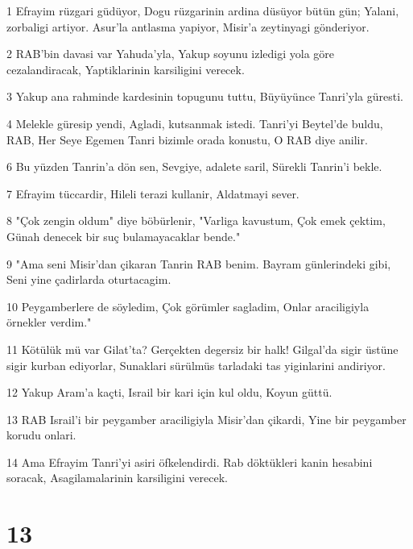 \par 1 Efrayim rüzgari güdüyor, Dogu rüzgarinin ardina düsüyor bütün gün; Yalani, zorbaligi artiyor. Asur'la antlasma yapiyor, Misir'a zeytinyagi gönderiyor.
\par 2 RAB'bin davasi var Yahuda'yla, Yakup soyunu izledigi yola göre cezalandiracak, Yaptiklarinin karsiligini verecek.
\par 3 Yakup ana rahminde kardesinin topugunu tuttu, Büyüyünce Tanri'yla güresti.
\par 4 Melekle güresip yendi, Agladi, kutsanmak istedi. Tanri'yi Beytel'de buldu, RAB, Her Seye Egemen Tanri bizimle orada konustu, O RAB diye anilir.
\par 6 Bu yüzden Tanrin'a dön sen, Sevgiye, adalete saril, Sürekli Tanrin'i bekle.
\par 7 Efrayim tüccardir, Hileli terazi kullanir, Aldatmayi sever.
\par 8 "Çok zengin oldum" diye böbürlenir, "Varliga kavustum, Çok emek çektim, Günah denecek bir suç bulamayacaklar bende."
\par 9 "Ama seni Misir'dan çikaran Tanrin RAB benim. Bayram günlerindeki gibi, Seni yine çadirlarda oturtacagim.
\par 10 Peygamberlere de söyledim, Çok görümler sagladim, Onlar araciligiyla örnekler verdim."
\par 11 Kötülük mü var Gilat'ta? Gerçekten degersiz bir halk! Gilgal'da sigir üstüne sigir kurban ediyorlar, Sunaklari sürülmüs tarladaki tas yiginlarini andiriyor.
\par 12 Yakup Aram'a kaçti, Israil bir kari için kul oldu, Koyun güttü.
\par 13 RAB Israil'i bir peygamber araciligiyla Misir'dan çikardi, Yine bir peygamber korudu onlari.
\par 14 Ama Efrayim Tanri'yi asiri öfkelendirdi. Rab döktükleri kanin hesabini soracak, Asagilamalarinin karsiligini verecek.

\chapter{13}

